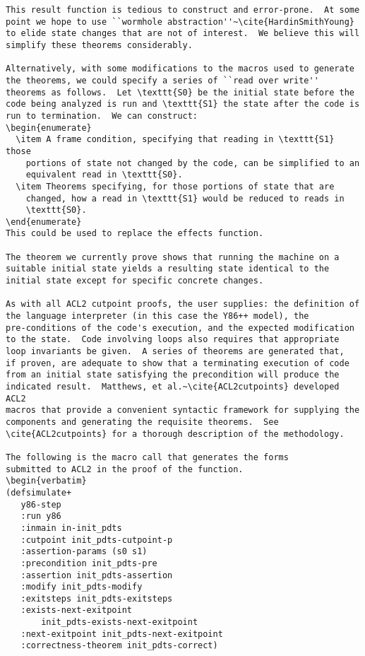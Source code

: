 \documentclass[submission,copyright]{eptcs} \providecommand{\event}{ACL2 2011}
\begin{document}
\begin{verbatim}
This result function is tedious to construct and error-prone.  At some
point we hope to use ``wormhole abstraction''~\cite{HardinSmithYoung}
to elide state changes that are not of interest.  We believe this will
simplify these theorems considerably.  

Alternatively, with some modifications to the macros used to generate
the theorems, we could specify a series of ``read over write''
theorems as follows.  Let \texttt{S0} be the initial state before the
code being analyzed is run and \texttt{S1} the state after the code is
run to termination.  We can construct:
\begin{enumerate}
  \item A frame condition, specifying that reading in \texttt{S1} those
    portions of state not changed by the code, can be simplified to an
    equivalent read in \texttt{S0}.
  \item Theorems specifying, for those portions of state that are
    changed, how a read in \texttt{S1} would be reduced to reads in
    \texttt{S0}.
\end{enumerate}
This could be used to replace the effects function.  

The theorem we currently prove shows that running the machine on a
suitable initial state yields a resulting state identical to the
initial state except for specific concrete changes.

As with all ACL2 cutpoint proofs, the user supplies: the definition of
the language interpreter (in this case the Y86++ model), the
pre-conditions of the code's execution, and the expected modification
to the state.  Code involving loops also requires that appropriate
loop invariants be given.  A series of theorems are generated that,
if proven, are adequate to show that a terminating execution of code
from an initial state satisfying the precondition will produce the
indicated result.  Matthews, et al.~\cite{ACL2cutpoints} developed ACL2
macros that provide a convenient syntactic framework for supplying the
components and generating the requisite theorems.  See
\cite{ACL2cutpoints} for a thorough description of the methodology.

The following is the macro call that generates the forms
submitted to ACL2 in the proof of the function.
\begin{verbatim}
(defsimulate+
   y86-step
   :run y86
   :inmain in-init_pdts
   :cutpoint init_pdts-cutpoint-p
   :assertion-params (s0 s1)
   :precondition init_pdts-pre
   :assertion init_pdts-assertion
   :modify init_pdts-modify
   :exitsteps init_pdts-exitsteps
   :exists-next-exitpoint 
       init_pdts-exists-next-exitpoint
   :next-exitpoint init_pdts-next-exitpoint
   :correctness-theorem init_pdts-correct)
\end{verbatim}
\end{document}
